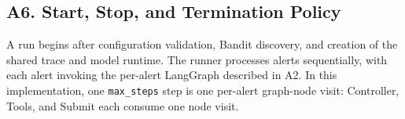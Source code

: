 \documentclass[11pt]{article}
\begin{document}
\clearpage
\subsection*{A6. Start, Stop, and Termination Policy}
\begingroup\small
A run begins after configuration validation, Bandit discovery, and creation of the shared trace and model runtime. The runner processes alerts sequentially, with each alert invoking the per-alert LangGraph described in A2. In this implementation, one \texttt{max\_steps} step is one per-alert graph-node visit: Controller, Tools, and Submit each consume one node visit.

\par\vspace{9pt}
\end{document}
